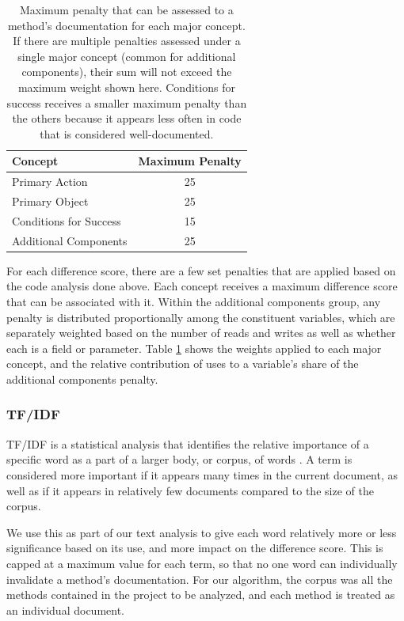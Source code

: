 \documentclass[preprint]{sigplanconf}
\begin{document}
\begin{table}
	\begin{center}
		\begin{tabular}{ l | c }
		Concept & Maximum Penalty \\
		\hline
		Primary Action & 25 \\
		Primary Object & 25 \\
		Conditions for Success & 15 \\
		Additional Components & 25 \\
		\end{tabular}
	\end{center}
	\caption{Maximum penalty that can be assessed to a method's documentation for each major concept. If there are multiple penalties assessed under a single major concept (common for additional components), their sum will not exceed the maximum weight shown here. Conditions for success receives a smaller maximum penalty than the others because it appears less often in code that is considered well-documented.}
	\label{table-concept-penalty}
\end{table}

For each difference score, there are a few set penalties that are applied based on the code analysis done above. Each concept receives a maximum difference score that can be associated with it. Within the additional components group, any penalty is distributed proportionally among the constituent variables, which are separately weighted based on the number of reads and writes as well as whether each is a field or parameter. Table \ref{table-concept-penalty} shows the weights applied to each major concept, and the relative contribution of uses to a variable's share of the additional components penalty.

\subsubsection{TF/IDF}
TF/IDF is a statistical analysis that identifies the relative importance of a specific word as a part of a larger body, or corpus, of words \cite{stanford}. A term is considered more important if it appears many times in the current document, as well as if it appears in relatively few documents compared to the size of the corpus.

We use this as part of our text analysis to give each word relatively more or less significance based on its use, and more impact on the difference score. This is capped at a maximum value for each term, so that no one word can individually invalidate a method's documentation. For our algorithm, the corpus was all the methods contained in the project to be analyzed, and each method is treated as an individual document.
\end{document}
